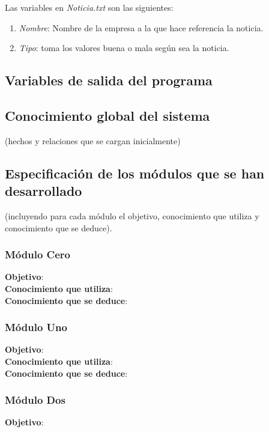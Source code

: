 \documentclass[12pt]{article}
\begin{document}
Las variables en \textit{Noticia.txt} son las siguientes:
\begin{enumerate}
\item \textit{Nombre}: Nombre de la empresa a la que hace referencia la noticia.
\item \textit{Tipo}: toma los valores buena o mala según sea la noticia.
\end{enumerate}

\subsection{Variables de salida del programa}

\subsection{Conocimiento global del sistema}
(hechos y relaciones que se cargan inicialmente)

\subsection{Especificación de los módulos que se han desarrollado}
(incluyendo para cada módulo el objetivo, conocimiento que utiliza y conocimiento que se deduce).

\subsubsection{Módulo Cero}
\textbf{Objetivo}: \\

\textbf{Conocimiento que utiliza}: \\

\textbf{Conocimiento que se deduce}:

\subsubsection{Módulo Uno}
\textbf{Objetivo}: \\

\textbf{Conocimiento que utiliza}: \\

\textbf{Conocimiento que se deduce}:

\subsubsection{Módulo Dos}
\textbf{Objetivo}: \\
\end{document}
